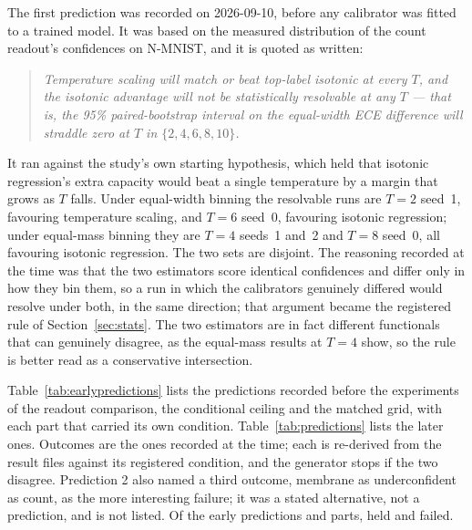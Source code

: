 \documentclass[10pt]{article}
\begin{document}
The first prediction was recorded on 2026-09-10, before any calibrator was fitted to a trained %
model. It was based on the measured distribution of the count readout's confidences on N-MNIST,
and it is quoted as written:
\begin{quote}
\emph{Temperature scaling will match or beat top-label isotonic at every $T$, and the isotonic
advantage will not be statistically resolvable at any $T$ --- that is, the 95\% %
paired-bootstrap interval on the equal-width ECE difference will straddle zero at $T$ in
$\{2, 4, 6, 8, 10\}$.} %
\end{quote}
It ran against the study's own starting hypothesis, which held that isotonic regression's extra
capacity would beat a single temperature by a margin that grows as $T$ falls. Under equal-width
binning the resolvable runs are $T=2$ seed~1, favouring temperature scaling, and $T=6$ seed~0, %
favouring isotonic regression; under equal-mass binning they are $T=4$ seeds~1 and~2 and $T=8$ %
seed~0, all favouring isotonic regression. The two sets are disjoint. The reasoning recorded at
the time was that the two estimators score identical confidences and differ only in how they bin
them, so a run in which the calibrators genuinely differed would resolve under both, in the same
direction; that argument became the registered rule of Section~\ref{sec:stats}. The two
estimators are in fact different functionals that can genuinely disagree, as the equal-mass
results at $T=4$ show, so the rule is better read as a conservative intersection.

Table~\ref{tab:earlypredictions} lists the predictions recorded before the experiments of the
readout comparison, the conditional ceiling and the matched grid, with each part that carried its
own condition. Table~\ref{tab:predictions} lists the later ones. Outcomes are the ones recorded at
the time; each is re-derived from the result files against its registered condition, and the
generator stops if the two disagree. Prediction 2 also named a third outcome, membrane as
underconfident as count, as the more interesting failure; it was a stated alternative, not a
prediction, and is not listed. Of the \predictionsEarly{} early predictions and parts, %
\predictionsEarlyHeld{} held and \predictionsEarlyFalsified{} failed. %
\end{document}
